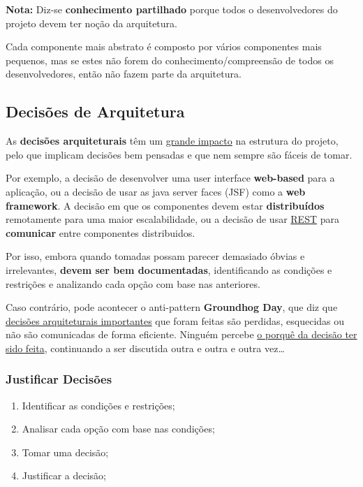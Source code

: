 \documentclass{article}
\begin{document}
\begin{flushleft}
  \textbf{Nota:} Diz-se \textbf{conhecimento partilhado} porque todos o
  desenvolvedores do projeto devem ter noção da arquitetura.

  Cada componente mais abstrato é composto por vários componentes mais
  pequenos, mas se estes não forem do conhecimento/compreensão de todos os desenvolvedores,
  então não fazem parte da arquitetura.
\end{flushleft}

\subsection{Decisões de Arquitetura}

As \textbf{decisões arquiteturais} têm um \uline{grande impacto} na estrutura do projeto, pelo que implicam
decisões bem pensadas e que nem sempre são fáceis de tomar.

\vspace{2mm}

Por exemplo, a decisão de desenvolver uma user interface \textbf{web-based}
para a aplicação, ou a decisão de usar as java server  faces (JSF)
como a \textbf{web framework}. A decisão em que os componentes devem estar
\textbf{distribuídos} remotamente para uma maior escalabilidade, ou
a decisão de usar \uline{REST} para \textbf{comunicar} entre componentes
distribuidos.

\vspace{2mm}

Por isso, embora quando tomadas possam parecer demasiado óbvias e irrelevantes, \textbf{devem ser
bem documentadas}, identificando as condições e restrições e analizando cada opção com
base nas anteriores.

\vspace{2mm}

Caso contrário, pode acontecer o anti-pattern \textbf{Groundhog Day}, que
diz que \uline{decisões arquiteturais importantes} que foram feitas
são perdidas, esquecidas ou não são comunicadas de forma eficiente.
Ninguém percebe \uline{o porquê da decisão ter sido feita}, continuando
a ser discutida outra e outra e outra vez\dots


\subsubsection{Justificar Decisões}

\begin{enumerate}
  \item Identificar as condições e restrições;
  \item Analisar cada opção com base nas condições;
  \item Tomar uma decisão;
  \item Justificar a decisão;
\end{enumerate}
\end{document}
